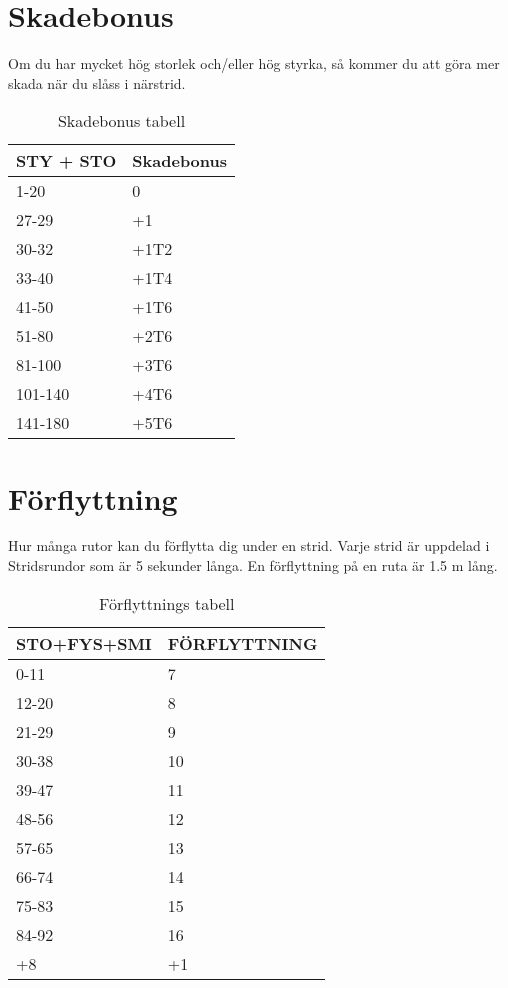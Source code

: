 \documentclass[a4paper, 10pt, titlepage]{article}
\begin{document}
\newpage
\section{Skadebonus}

Om du har mycket hög storlek och/eller hög styrka, så kommer du att göra
mer skada när du slåss i närstrid.

\begin{table}[hbp]
  \caption{Skadebonus tabell}
 \begin{tabular}{|l|l|}
   \hline
   STY + STO  &  Skadebonus \\
   \hline
   1-20       & 0     \\
   \hline
   27-29      & +1    \\
   \hline
   30-32      & +1T2  \\
   \hline
   33-40      & +1T4  \\
   \hline
   41-50      & +1T6  \\
   \hline
   51-80      & +2T6  \\
   \hline
   81-100     & +3T6   \\
   \hline
   101-140    & +4T6   \\
   \hline
   141-180    & +5T6   \\
   \hline
 \end{tabular}
\end{table}

\section{Förflyttning}
Hur många rutor kan du förflytta dig under en strid. Varje
strid är uppdelad i Stridsrundor som är 5 sekunder långa.
En förflyttning på en ruta är 1.5 m lång.

\begin{table}[hbp]
  \caption{Förflyttnings tabell}
 \begin{tabular}{|l|l|}
   \hline
   STO+FYS+SMI & FÖRFLYTTNING \\
   \hline
   0-11        & 7  \\
   \hline
   12-20       & 8  \\
   \hline
   21-29       & 9  \\
   \hline
   30-38       & 10 \\
   \hline
   39-47       & 11 \\
   \hline
   48-56       & 12 \\
   \hline
   57-65       & 13 \\
   \hline
   66-74       & 14 \\
   \hline
   75-83       & 15 \\
   \hline
   84-92       & 16 \\
   \hline
   +8          & +1 \\
   \hline
 \end{tabular}
\end{table}
\end{document}
